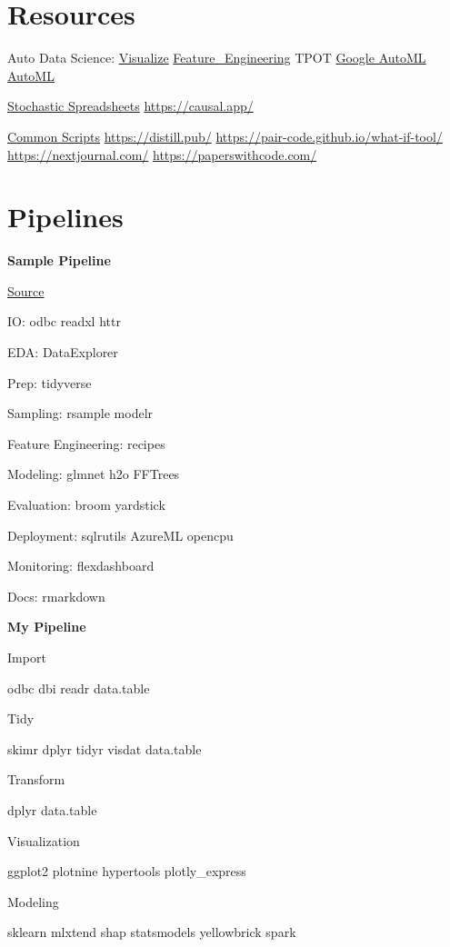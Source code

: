 \documentclass[]{book}
\begin{document}
\hypertarget{resources}{%
\section{Resources}\label{resources}}

Auto Data Science: \href{http://holoviews.org}{Visualize} \href{https://www.featuretools.com}{Feature\_Engineering} TPOT \href{https://cloud.google.com/automl/}{Google AutoML} \href{https://www.automl.org/}{AutoML}

\href{https://www.getguesstimate.com/}{Stochastic Spreadsheets} \url{https://causal.app/}

\href{http://chrisalbon.com/}{Common Scripts} \url{https://distill.pub/} \url{https://pair-code.github.io/what-if-tool/} \url{https://nextjournal.com/} \url{https://paperswithcode.com/}

\hypertarget{pipelines}{%
\section{Pipelines}\label{pipelines}}

\textbf{Sample Pipeline}

\href{https://mobile.twitter.com/TheStephLocke/status/990251709531344896}{Source}

IO: odbc readxl httr

EDA: DataExplorer

Prep: tidyverse

Sampling: rsample modelr

Feature Engineering: recipes

Modeling: glmnet h2o FFTrees

Evaluation: broom yardstick

Deployment: sqlrutils AzureML opencpu

Monitoring: flexdashboard

Docs: rmarkdown

\textbf{My Pipeline}

Import

odbc dbi readr data.table

Tidy

skimr dplyr tidyr visdat data.table

Transform

dplyr data.table

Visualization

ggplot2 plotnine hypertools plotly\_express

Modeling

sklearn mlxtend shap statsmodels yellowbrick spark
\end{document}

